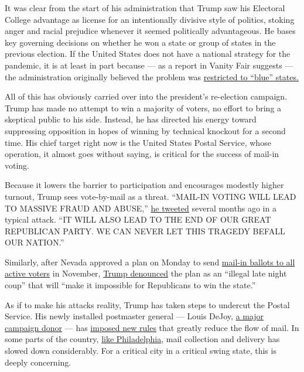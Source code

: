 It was clear from the start of his administration that Trump saw his
Electoral College advantage as license for an intentionally divisive
style of politics, stoking anger and racial prejudice whenever it seemed
politically advantageous. He bases key governing decisions on whether he
won a state or group of states in the previous election. If the United
States does not have a national strategy for the pandemic, it is at
least in part because --- as a report in Vanity Fair suggests --- the
administration originally believed the problem was
\href{https://www.vanityfair.com/news/2020/07/how-jared-kushners-secret-testing-plan-went-poof-into-thin-air}{restricted
to ``blue'' states.}

All of this has obviously carried over into the president's re-election
campaign. Trump has made no attempt to win a majority of voters, no
effort to bring a skeptical public to his side. Instead, he has directed
his energy toward suppressing opposition in hopes of winning by
technical knockout for a second time. His chief target right now is the
United States Postal Service, whose operation, it almost goes without
saying, is critical for the success of mail-in voting.

Because it lowers the barrier to participation and encourages modestly
higher turnout, Trump sees vote-by-mail as a threat. ``MAIL-IN VOTING
WILL LEAD TO MASSIVE FRAUD AND ABUSE,''
\href{https://twitter.com/realdonaldtrump/status/1266172570983940101?s=21}{he
tweeted} several months ago in a typical attack. ``IT WILL ALSO LEAD TO
THE END OF OUR GREAT REPUBLICAN PARTY. WE CAN NEVER LET THIS TRAGEDY
BEFALL OUR NATION.''

Similarly, after Nevada approved a plan on Monday to send
\href{https://www.cnn.com/2020/08/03/politics/nevada-mail-ballots-registered-voters/index.html}{mail-in
ballots to all active voters} in November,
\href{https://twitter.com/realdonaldtrump/status/1290250416278532096?s=21}{Trump
denounced} the plan as an ``illegal late night coup'' that will ``make
it impossible for Republicans to win the state.''

As if to make his attacks reality, Trump has taken steps to undercut the
Postal Service. His newly installed postmaster general --- Louis DeJoy,
\href{https://www.nytimes3xbfgragh.onion/2020/07/31/us/politics/trump-usps-mail-delays.html}{a
major campaign donor} --- has
\href{https://www.washingtonpost.com/business/2020/07/14/postal-service-trump-dejoy-delay-mail/}{imposed
new rules} that greatly reduce the flow of mail. In some parts of the
country, \href{https://t.co/MPqSHlXP1P}{like Philadelphia}, mail
collection and delivery has slowed down considerably. For a critical
city in a critical swing state, this is deeply concerning.

